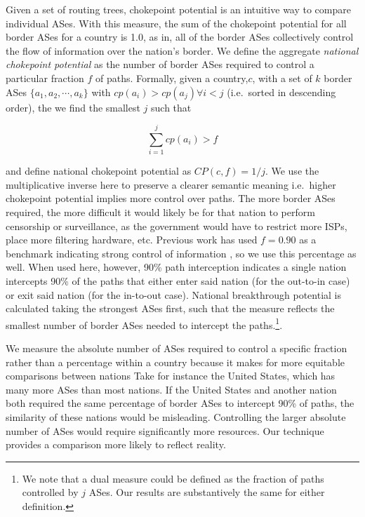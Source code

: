 Given a set of routing trees, chokepoint potential is an intuitive way to
compare individual ASes. With this measure, the sum of the chokepoint potential
for all border ASes for a country is 1.0, as in, all of the border ASes
collectively control the flow of information over the nation's border. We
define the aggregate \emph{national chokepoint potential} as the number of
border ASes required to control a particular fraction $f$ of paths. Formally,
given a country,$c$, with a set of $k$ border ASes $\{a_1,a_2,\cdots,a_k\}$ with
$cp(a_i)>cp(a_j) \forall i<j$ (i.e.\ sorted in descending order), the
we find the smallest $j$ such that 

\begin{equation}
  \label{eq:nationalchokepoint}
  \sum_{i=1}^j cp(a_i) > f
\end{equation}

and define national chokepoint potential as $CP(c,f) = 1/j$. We use the
multiplicative inverse here to preserve a clearer semantic meaning i.e.\ higher
chokepoint potential implies more control over paths. The more border ASes
required, the more difficult it would likely be for that nation to perform
censorship or surveillance, as the government would have to restrict more ISPs,
place more filtering hardware, etc. 
Previous work has used $f=0.90$ as a benchmark indicating strong control of information
\cite{throats}, so we use this percentage as well. When used here, however,
90\% path interception indicates a single nation intercepts 90\% of the paths
that either enter said nation (for the out-to-in case) or exit said nation (for
the in-to-out case). National breakthrough potential is calculated taking the
strongest ASes first, such that the measure reflects the smallest number of
border ASes needed to intercept the paths.\footnote{We note that a dual measure
could be defined as the fraction of paths controlled by $j$ ASes. Our results
are substantively the same for either definition.}. 

We measure the absolute number of ASes required to control a specific
fraction rather than a percentage within a country because it makes for more
equitable comparisons between nations
Take for instance the United States, which has many more ASes than
most nations. If the United States and another nation both required the same
percentage of border ASes to intercept 90\% of paths, the similarity of these
nations would be misleading. Controlling the larger absolute number of ASes
would require significantly more resources. Our technique provides a comparison more likely to
reflect reality. 
